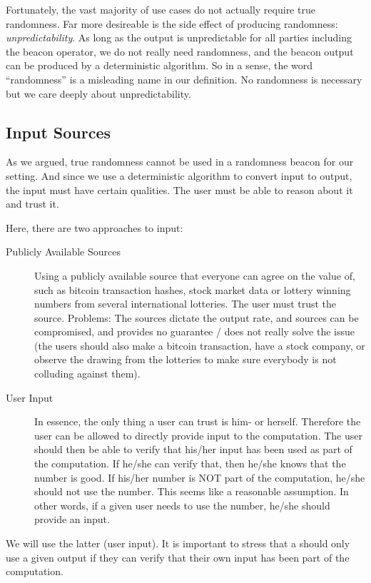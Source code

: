 Fortunately, the vast majority of use cases do not actually require true randomness. Far more desireable is the side effect of producing randomness: \emph{unpredictability}. As long as the output is unpredictable for all parties including the beacon operator, we do not really need randomness, and the beacon output can be produced by a deterministic algorithm. So in a sense, the word \enquote{randomness} is a misleading name in our definition. No randomness is necessary but we care deeply about unpredictability.

\subsection{Input Sources}
As we argued, true randomness cannot be used in a randomness beacon for our setting. And since we use a deterministic algorithm to convert input to output, the input must have certain qualities. The user must be able to reason about it and trust it.

Here, there are two approaches to input:

\begin{description}
    \item[Publicly Available Sources] Using a publicly available source that everyone can agree on the value of, such as bitcoin transaction hashes, stock market data or lottery winning numbers from several international lotteries. The user must trust the source. Problems: The sources dictate the output rate, and sources can be compromised, and provides no guarantee / does not really solve the issue (the users should also make a bitcoin transaction, have a stock company, or observe the drawing from the lotteries to make sure everybody is not colluding against them).

    \item[User Input] In essence, the only thing a user can trust is him- or herself. Therefore the user can be allowed to directly provide input to the computation. The user should then be able to verify that his/her input has been used as part of the computation. If he/she can verify that, then he/she knows that the number is good. If his/her number is NOT part of the computation, he/she should not use the number. This seems like a reasonable assumption. In other words, if a given user needs to use the number, he/she should provide an input.
\end{description}

We will use the latter (user input). It is important to stress that a should only use a given output if they can verify that their own input has been part of the computation.

